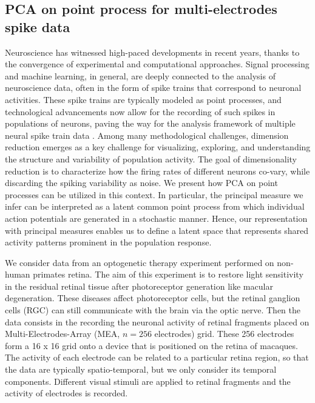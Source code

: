\documentclass[aos]{imsart}
\theoremstyle{plain}
\theoremstyle{remark}
\newcommand{\1}{1}
\begin{document}
\subsection{PCA on point process for multi-electrodes spike data}

Neuroscience has witnessed high-paced developments in recent years, thanks to the convergence of experimental and computational approaches. Signal processing and machine learning, in general, are deeply connected to the analysis of neuroscience data, often in the form of spike trains that correspond to neuronal activities. These spike trains are typically modeled as point processes, and technological advancements now allow for the recording of such spikes in populations of neurons, paving the way for the analysis framework of multiple neural spike train data \cite{Cunningham2014}. Among many methodological challenges, dimension reduction emerges as a key challenge for visualizing, exploring, and understanding the structure and variability of population activity. The goal of dimensionality reduction is to characterize how the firing rates of different neurons co-vary, while discarding the spiking variability as noise. We present how PCA on point processes can be utilized in this context. In particular, the principal measure we infer can be interpreted as a latent common point process from which individual action potentials are generated in a stochastic manner. Hence, our representation with principal measures enables us to define a latent space that represents shared activity patterns prominent in the population response.

We consider data from an optogenetic therapy experiment performed on non-human primates retina. The aim of this experiment is to restore light sensitivity in the residual retinal tissue after photoreceptor generation like macular degeneration. These diseases affect photoreceptor cells, but the retinal ganglion cells (RGC) can still communicate with the brain via the optic nerve. Then the data consists in the recording the neuronal activity of retinal fragments placed on Multi-Electrodes-Array (MEA, $n=256$ electrodes) grid. These 256 electrodes form a 16 x 16 grid onto a device that is positioned on the retina of macaques. The activity of each electrode can be related to a particular retina region, so that the data are typically spatio-temporal, but we only consider its temporal components. Different visual stimuli are applied to retinal fragments and the activity of electrodes is recorded. 
\end{document}
